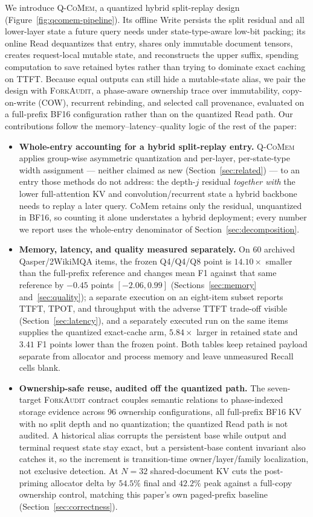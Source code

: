 \documentclass{article}
\newcommand{\qcomem}{\textsc{Q-CoMem}}
\newcommand{\method}{\textsc{ForkAudit}}
\begin{document}
We introduce \qcomem{}, a quantized hybrid split-replay design
(Figure~\ref{fig:qcomem-pipeline}). Its offline Write persists the split
residual and all lower-layer state a future query needs under state-type-aware
low-bit packing; its online Read dequantizes that entry, shares only immutable
document tensors, creates request-local mutable state, and reconstructs the
upper suffix, spending computation to save retained bytes rather than trying to
dominate exact caching on TTFT. Because equal outputs can still hide
a mutable-state alias, we pair the design with \method{}, a phase-aware
ownership trace over immutability, copy-on-write (COW), recurrent rebinding,
and selected call provenance, evaluated on a full-prefix BF16 configuration
rather than on the quantized Read path. Our contributions follow the
memory--latency--quality logic of the rest of the paper:
\begin{itemize}
  \setlength{\itemsep}{1pt}
  \setlength{\parskip}{0pt}
  \item \textbf{Whole-entry accounting for a hybrid split-replay entry.}
\qcomem{} applies group-wise asymmetric quantization and per-layer,
per-state-type width assignment --- neither claimed as new
(Section~\ref{sec:related}) --- to an entry those methods do not address: the
depth-$j$ residual \emph{together with} the lower full-attention KV and
convolution/recurrent state a hybrid backbone needs to replay a later query.
CoMem retains only the residual, unquantized in BF16, so counting it alone
understates a hybrid deployment; every number we report uses the whole-entry
denominator of Section~\ref{sec:decomposition}.
  \item \textbf{Memory, latency, and quality measured separately.} On 60 archived
Qasper/2WikiMQA items, the frozen Q4/Q4/Q8 point is $14.10\times$ smaller than
the full-prefix reference and changes mean F1 against that same reference by
$-0.45$ points $[-2.06,0.99]$ (Sections~\ref{sec:memory}
and~\ref{sec:quality}); a separate execution on an eight-item subset
reports TTFT, TPOT, and throughput with the adverse TTFT trade-off visible
(Section~\ref{sec:latency}), and a separately executed run on the same items
supplies the quantized exact-cache arm, $5.84\times$ larger in retained state
and $3.41$ F1 points lower than the frozen point. Both tables
keep retained payload separate from allocator and process memory and leave
unmeasured Recall cells blank.
  \item \textbf{Ownership-safe reuse, audited off the quantized path.} The
seven-target \method{} contract couples semantic relations to phase-indexed
storage evidence across 96 ownership configurations, all full-prefix BF16 KV
with no split depth and no quantization; the quantized Read path is not
audited. A historical alias corrupts the persistent base while output and terminal
request state stay exact, but a persistent-base content invariant also catches
it, so the increment is transition-time owner/layer/family localization, not
exclusive detection. At $N=32$ shared-document KV cuts the
post-priming allocator delta by $54.5\%$ final and $42.2\%$ peak against a
full-copy ownership control, matching this paper's own paged-prefix baseline
(Section~\ref{sec:correctness}).
\end{itemize}
\end{document}
